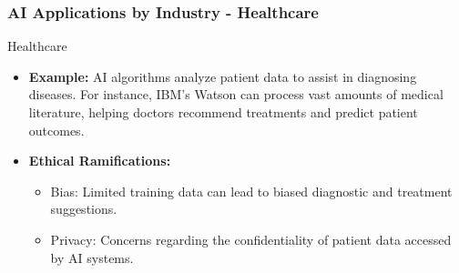 \documentclass[aspectratio=169]{beamer}
\begin{document}
\begin{frame}[fragile]
    \frametitle{AI Applications by Industry - Healthcare}
    \begin{block}{Healthcare}
        \begin{itemize}
            \item \textbf{Example:} AI algorithms analyze patient data to assist in diagnosing diseases. For instance, IBM’s Watson can process vast amounts of medical literature, helping doctors recommend treatments and predict patient outcomes.
            \item \textbf{Ethical Ramifications:}
            \begin{itemize}
                \item Bias: Limited training data can lead to biased diagnostic and treatment suggestions.
                \item Privacy: Concerns regarding the confidentiality of patient data accessed by AI systems.
            \end{itemize}
        \end{itemize}
    \end{block}
\end{frame}
\end{document}
